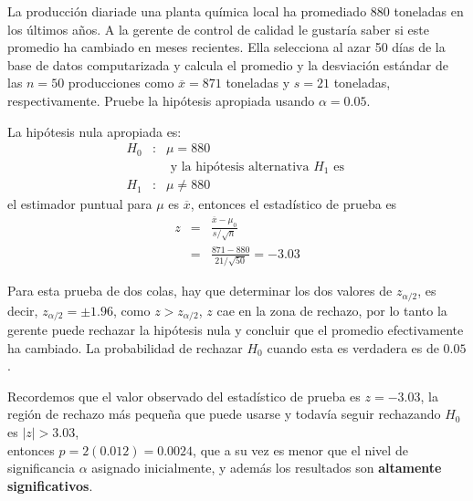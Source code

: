 \begin{frame}
\begin{frame}
\begin{Ejem}
La producci\'on diariade una planta qu\'imica local ha promediado 880 toneladas en los \'ultimos a\~nos. A la gerente de control de calidad le gustar\'ia saber si este promedio ha cambiado en meses recientes. Ella selecciona al azar 50 d\'ias de la base de datos computarizada y calcula el promedio y la desviaci\'on est\'andar de las $n=50$  producciones como $\overline{x}=871$ toneladas y $s=21$ toneladas, respectivamente. Pruebe la hip\'otesis  apropiada usando $\alpha=0.05$.

\end{Ejem}

\begin{Sol}
La hip\'otesis nula apropiada es:
\begin{eqnarray*}
H_{0}&:& \mu=880\\
&&\textrm{ y la hip\'otesis alternativa }H_{1}\textrm{ es }\\
H_{1}&:& \mu\neq880
\end{eqnarray*}
el estimador puntual para $\mu$ es $\overline{x}$, entonces el estad\'istico de prueba es\medskip
\begin{eqnarray*}
z&=&\frac{\overline{x}-\mu_{0}}{s/\sqrt{n}}\\
&=&\frac{871-880}{21/\sqrt{50}}=-3.03
\end{eqnarray*}
\end{Sol}







\begin{Sol}
Para esta prueba de  dos colas, hay que determinar los dos valores de $z_{\alpha/2}$, es decir,  $z_{\alpha/2}=\pm1.96$, como $z>z_{\alpha/2}$, $z$  cae en la zona de rechazo, por lo tanto  la gerente puede rechazar la hip\'otesis nula y concluir que el promedio efectivamente ha cambiado.\medskip
La probabilidad de rechazar $H_{0}$ cuando esta es verdadera es de $0.05$.


Recordemos que el valor observado del estad\'istico de prueba es $z=-3.03$, la regi\'on de rechazo m\'as peque\~na que puede usarse y todav\'ia seguir rechazando $H_{0}$ es $|z|>3.03$, \\
entonces $p=2(0.012)=0.0024$, que a su vez es menor que el nivel de significancia $\alpha$ asignado inicialmente, y adem\'as los resultados son  \textbf{altamente significativos}.


\end{Sol}







\end{frame}
\end{frame}
